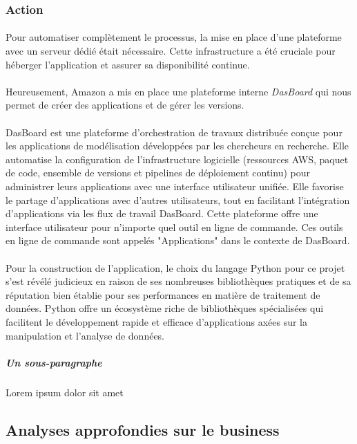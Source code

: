 \subsubsection{Action}

\paragraph{}
\vspace{-2em}
Pour automatiser complètement le processus, la mise en place d'une plateforme avec un serveur dédié était nécessaire. Cette infrastructure a été cruciale pour héberger l'application et assurer sa disponibilité continue. 
\paragraph{}
\vspace{-2em}
Heureusement, Amazon a mis en place une plateforme interne \textit{DasBoard} qui nous permet de créer des applications et de gérer les versions.

\paragraph{}
\vspace{-2em}
DasBoard est une plateforme d'orchestration de travaux distribuée conçue pour les applications de modélisation développées par les chercheurs en recherche. Elle automatise la configuration de l'infrastructure logicielle (ressources AWS, paquet de code, ensemble de versions et pipelines de déploiement continu) pour administrer leurs applications avec une interface utilisateur unifiée. Elle favorise le partage d'applications avec d'autres utilisateurs, tout en facilitant l'intégration d'applications via les flux de travail DasBoard. Cette plateforme offre une interface utilisateur pour n'importe quel outil en ligne de commande. Ces outils en ligne de commande sont appelés "Applications" dans le contexte de DasBoard.

\paragraph{}
\vspace{-2em}
Pour la construction de l'application, le choix du langage Python pour ce projet s'est révélé judicieux en raison de ses nombreuses bibliothèques pratiques et de sa réputation bien établie pour ses performances en matière de traitement de données. Python offre un écosystème riche de bibliothèques spécialisées qui facilitent le développement rapide et efficace d'applications axées sur la manipulation et l'analyse de données. 

\paragraph{}
\vspace{-2em}


\subparagraph{Un sous-paragraphe}
Lorem ipsum dolor sit amet

\subsection{Analyses approfondies sur le business}